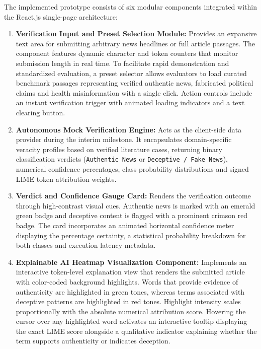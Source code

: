 \documentclass[12pt,a4paper,oneside]{report}
\begin{document}
The implemented prototype consists of six modular components integrated within the
React.js single-page architecture:

\begin{enumerate}[label=\arabic*., leftmargin=*, itemsep=4pt]
  \item \textbf{Verification Input and Preset Selection Module:}
        Provides an expansive text area for submitting arbitrary news headlines or full
        article passages. The component features dynamic character and token counters that
        monitor submission length in real time. To facilitate rapid demonstration and
        standardized evaluation, a preset selector allows evaluators to load curated
        benchmark passages representing verified authentic news, fabricated political claims
        and health misinformation with a single click. Action controls include an instant
        verification trigger with animated loading indicators and a text clearing button.

  \item \textbf{Autonomous Mock Verification Engine:}
        Acts as the client-side data provider during the interim milestone. It encapsulates
        domain-specific veracity profiles based on verified literature cases, returning
        binary classification verdicts (\texttt{Authentic News} or \texttt{Deceptive / Fake
        News}), numerical confidence percentages, class probability distributions and signed
        LIME token attribution weights.

  \item \textbf{Verdict and Confidence Gauge Card:}
        Renders the verification outcome through high-contrast visual cues. Authentic news
        is marked with an emerald green badge and deceptive content is flagged with a
        prominent crimson red badge. The card incorporates an animated horizontal confidence
        meter displaying the percentage certainty, a statistical probability breakdown for
        both classes and execution latency metadata.

  \item \textbf{Explainable AI Heatmap Visualization Component:}
        Implements an interactive token-level explanation view that renders the submitted
        article with color-coded background highlights. Words that provide evidence of
        authenticity are highlighted in green tones, whereas terms associated with deceptive
        patterns are highlighted in red tones. Highlight intensity scales proportionally
        with the absolute numerical attribution score. Hovering the cursor over any
        highlighted word activates an interactive tooltip displaying the exact LIME score
        alongside a qualitative indicator explaining whether the term supports authenticity
        or indicates deception.


\end{enumerate}
\end{document}
